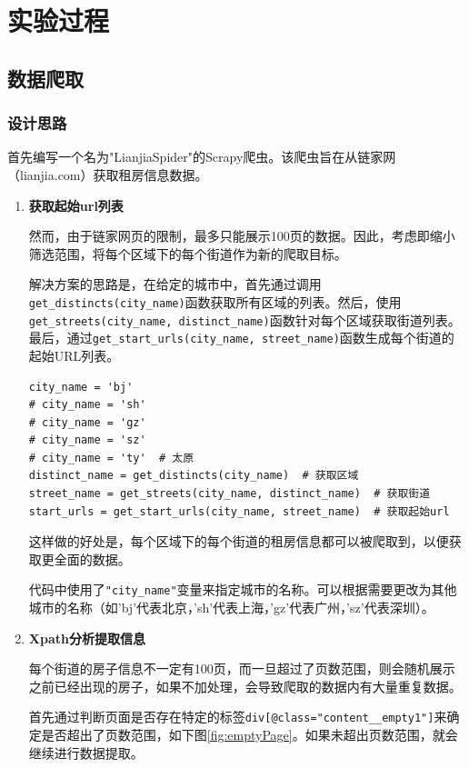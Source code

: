 \documentclass[lang=cn,11pt,a4paper]{elegantpaper}
\begin{document}
\section{实验过程}

\subsection{数据爬取}

\subsubsection{设计思路}

首先编写一个名为"LianjiaSpider"的Scrapy爬虫。该爬虫旨在从链家网（lianjia.com）获取租房信息数据。

\begin{enumerate}
\item \textbf{获取起始url列表}

然而，由于链家网页的限制，最多只能展示100页的数据。因此，考虑即缩小筛选范围，将每个区域下的每个街道作为新的爬取目标。

解决方案的思路是，在给定的城市中，首先通过调用\lstinline{get_distincts(city_name)}函数获取所有区域的列表。然后，使用\lstinline{get_streets(city_name, distinct_name)}函数针对每个区域获取街道列表。最后，通过\lstinline{get_start_urls(city_name, street_name)}函数生成每个街道的起始URL列表。

\begin{lstlisting}
city_name = 'bj'
# city_name = 'sh'
# city_name = 'gz'
# city_name = 'sz'
# city_name = 'ty'  # 太原
distinct_name = get_distincts(city_name)  # 获取区域
street_name = get_streets(city_name, distinct_name)  # 获取街道
start_urls = get_start_urls(city_name, street_name)  # 获取起始url
\end{lstlisting}


这样做的好处是，每个区域下的每个街道的租房信息都可以被爬取到，以便获取更全面的数据。

代码中使用了\lstinline{"city_name"}变量来指定城市的名称。可以根据需要更改为其他城市的名称（如'bj'代表北京，'sh'代表上海，'gz'代表广州，'sz'代表深圳）。




\item \textbf{Xpath分析提取信息}

每个街道的房子信息不一定有100页，而一旦超过了页数范围，则会随机展示之前已经出现的房子，如果不加处理，会导致爬取的数据内有大量重复数据。

首先通过判断页面是否存在特定的标签\lstinline{div[@class="content__empty1"]}来确定是否超出了页数范围，如下图\ref{fig:emptyPage}。如果未超出页数范围，就会继续进行数据提取。


\end{enumerate}
\end{document}
